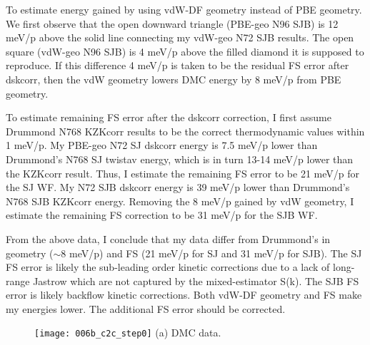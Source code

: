 To estimate energy gained by using vdW-DF geometry instead of PBE geometry. We first observe that the open downward triangle (PBE-geo N96 SJB) is 12 meV/p above the solid line connecting my vdW-geo N72 SJB results. The open square (vdW-geo N96 SJB) is 4 meV/p above the filled diamond it is supposed to reproduce. If this difference 4 meV/p is taken to be the residual FS error after dskcorr, then the vdW geometry lowers DMC energy by 8 meV/p from PBE geometry. 

To estimate remaining FS error after the dskcorr correction, I first assume Drummond N768 KZKcorr results to be the correct thermodynamic values within 1 meV/p. My PBE-geo N72 SJ dskcorr energy is 7.5 meV/p lower than Drummond's N768 SJ twistav energy, which is in turn 13-14 meV/p lower than the KZKcorr result. Thus, I estimate the remaining FS error to be 21 meV/p for the SJ WF. My N72 SJB dskcorr energy is 39 meV/p lower than Drummond's N768 SJB KZKcorr energy. Removing the 8 meV/p gained by vdW geometry, I estimate the remaining FS correction to be 31 meV/p for the SJB WF.

From the above data, I conclude that my data differ from Drummond's in geometry ($\sim$8 meV/p) and FS (21 meV/p for SJ and 31 meV/p for SJB). The SJ FS error is likely the sub-leading order kinetic corrections due to a lack of long-range Jastrow which are not captured by the mixed-estimator S(k). The SJB FS error is likely backflow kinetic corrections. Both vdW-DF geometry and FS make my energies lower. The additional FS error should be corrected.

\begin{figure}[h]
\begin{minipage}{0.48\textwidth}
\texttt{[image: 006b\_c2c\_step0]}
(a) DMC data.\label{fig:static-c2c-yang-drummond-data}
\end{minipage}
\end{figure}

